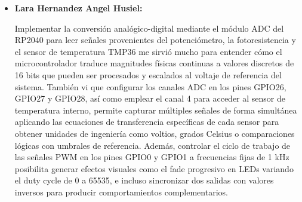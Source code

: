 \documentclass[letterpaper,12pt]{article}
\begin{document}
\begin{itemize}
        \item \textbf{Lara Hernandez Angel Husiel:}

        Implementar la conversión analógico-digital mediante el módulo ADC del RP2040 para leer señales provenientes del potenciómetro, la fotoresistencia y el sensor de temperatura TMP36 me sirvió mucho para entender cómo el microcontrolador traduce magnitudes físicas continuas a valores discretos de 16 bits que pueden ser procesados y escalados al voltaje de referencia del sistema. También vi que configurar los canales ADC en los pines GPIO26, GPIO27 y GPIO28, así como emplear el canal 4 para acceder al sensor de temperatura interno, permite capturar múltiples señales de forma simultánea aplicando las ecuaciones de transferencia específicas de cada sensor para obtener unidades de ingeniería como voltios, grados Celsius o comparaciones lógicas con umbrales de referencia. Además, controlar el ciclo de trabajo de las señales PWM en los pines GPIO0 y GPIO1 a frecuencias fijas de 1 kHz posibilita generar efectos visuales como el fade progresivo en LEDs variando el duty cycle de 0 a 65535, e incluso sincronizar dos salidas con valores inversos para producir comportamientos complementarios. 

    \end{itemize}

    \newpage

    \nocite{*}
    \printbibliography[heading=bibintoc, title={Referencias}]
\end{document}

